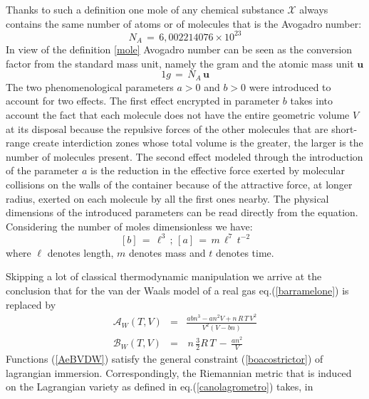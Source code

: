 \documentclass[10pt,a4paper]{article}
\begin{document}
Thanks to such a  definition one mole of any chemical substance
$\mathcal{X}$ always contains the same number of atoms or of
molecules that is the Avogadro number:
\begin{equation}\label{numeroagrado}
    N_A \, = \, 6,002214076 \times 10^{23}
\end{equation}
In view of the definition \ref{mole}  Avogadro number can be seen as the conversion factor  from the standard  mass unit, namely the gram and the atomic mass unit $\mathbf{u}$
\begin{equation}\label{conversiaconavo}
    1 g \, = \, N_A \, \mathbf{u}
\end{equation}
The two phenomenological parameters $a>0$ and  $b>0$ were introduced to account for two effects. The first effect
encrypted in parameter  $b$ takes into account the fact that each molecule does not have the entire geometric
volume $V$ at its disposal because the repulsive forces of the other molecules that are short-range create interdiction zones whose total volume is the greater, the larger is the number of molecules present. The second effect modeled through the introduction of the parameter  $a$  is the reduction in the effective force exerted by
molecular collisions on the walls of the container because of the attractive force, at longer radius, exerted on
each molecule by all the first ones nearby. The physical dimensions of the introduced parameters can be read
directly from the equation. Considering the number of moles dimensionless  we have:
\begin{equation}\label{dimemparam}
    \left[b\right]\, =\, \ell^3 \, ; \,  \left[a\right]\, =
   \,m  \,\ell^7\, t^{-2}
\end{equation}
where $\ell$ denotes length, $m$ denotes mass and $t$ denotes time.
\par
Skipping a lot of classical thermodynamic manipulation we arrive at the conclusion that for the van der Waals model of a real gas eq.(\ref{barramelone}) is replaced by
\begin{eqnarray}
\label{AeBVDW}
  \mathcal{A}_W(T,V) &=& \frac{a b n^3-a n^2 V+n \,R\,T\, V^2}{V^2 (V-b n)}\nonumber\\
  \mathcal{B}_W(T,V) &=& \,n \, \frac{3}{2}R \, T \, -\, \frac{a n^2}{V}
\end{eqnarray}
Functions (\ref{AeBVDW}) satisfy
the general constraint (\ref{boacostrictor}) of lagrangian  immersion. Correspondingly, the Riemannian metric that is induced on the Lagrangian variety as defined in eq.(\ref{canolagrometro}) takes, in
\end{document}
